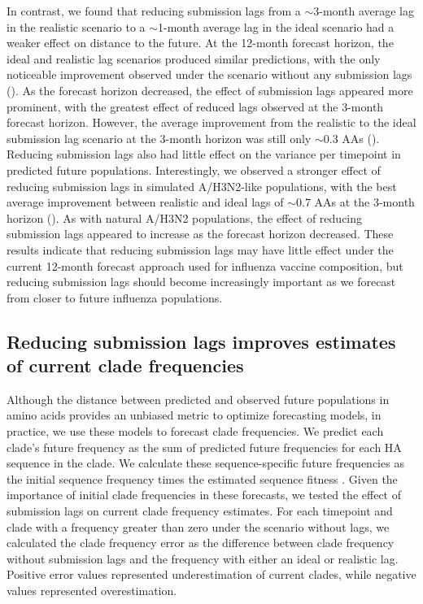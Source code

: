 \documentclass[9pt,lineno]{elife}
\begin{document}
In contrast, we found that reducing submission lags from a $\sim$3-month average lag in the realistic scenario to a $\sim$1-month average lag in the ideal scenario had a weaker effect on distance to the future.
At the 12-month forecast horizon, the ideal and realistic lag scenarios produced similar predictions, with the only noticeable improvement observed under the scenario without any submission lags ().
As the forecast horizon decreased, the effect of submission lags appeared more prominent, with the greatest effect of reduced lags observed at the 3-month forecast horizon.
However, the average improvement from the realistic to the ideal submission lag scenario at the 3-month horizon was still only $\sim$0.3 AAs ().
Reducing submission lags also had little effect on the variance per timepoint in predicted future populations.
Interestingly, we observed a stronger effect of reducing submission lags in simulated A/H3N2-like populations, with the best average improvement between realistic and ideal lags of $\sim$0.7 AAs at the 3-month horizon ().
As with natural A/H3N2 populations, the effect of reducing submission lags appeared to increase as the forecast horizon decreased.
These results indicate that reducing submission lags may have little effect under the current 12-month forecast approach used for influenza vaccine composition, but reducing submission lags should become increasingly important as we forecast from closer to future influenza populations.

\subsection{Reducing submission lags improves estimates of current clade frequencies}

Although the distance between predicted and observed future populations in amino acids provides an unbiased metric to optimize forecasting models, in practice, we use these models to forecast clade frequencies.
We predict each clade's future frequency as the sum of predicted future frequencies for each HA sequence in the clade.
We calculate these sequence-specific future frequencies as the initial sequence frequency times the estimated sequence fitness \citep{Luksza:2014hj,Huddleston2020}.
Given the importance of initial clade frequencies in these forecasts, we tested the effect of submission lags on current clade frequency estimates.
For each timepoint and clade with a frequency greater than zero under the scenario without lags, we calculated the clade frequency error as the difference between clade frequency without submission lags and the frequency with either an ideal or realistic lag.
Positive error values represented underestimation of current clades, while negative values represented overestimation.
\end{document}
